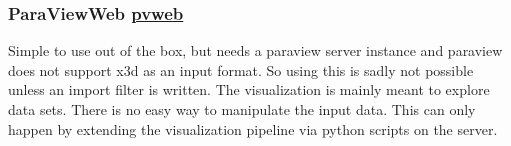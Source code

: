 \subsubsection{\texorpdfstring{ParaViewWeb
\href{http://paraviewweb.kitware.com/}{pvweb}}{ParaViewWeb pvweb}}\label{paraviewweb-pvweb}

Simple to use out of the box, but needs a paraview server instance and
paraview does not support x3d as an input format. So using this is sadly
not possible unless an import filter is written. The visualization is
mainly meant to explore data sets. There is no easy way to manipulate
the input data. This can only happen by extending the visualization
pipeline via python scripts on the server.
